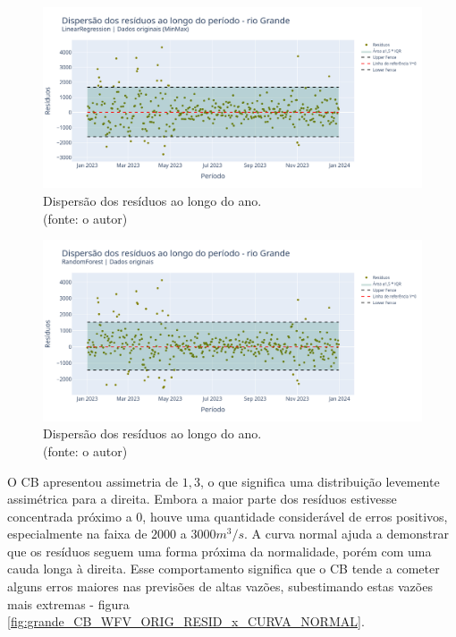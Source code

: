 \begin{figure}[!h]
\centering
\includegraphics[scale=0.33]{Figuras/rio_grande/wfv/LR/LR_WFV_ORIG_RESID_x_TEMPO.png}
\caption{Dispersão dos resíduos ao longo do ano.\\(fonte: o autor)}
\label{fig:grande_LR_WFV_ORIG_RESID_x_TEMPO}
\end{figure}

\begin{figure}[!h]
\centering
\includegraphics[scale=0.33]{Figuras/rio_grande/wfv/RF/RF_WFV_ORIG_RESID_x_TEMPO.png}
\caption{Dispersão dos resíduos ao longo do ano.\\(fonte: o autor)}
\label{fig:grande_RF_WFV_ORIG_RESID_x_TEMPO}
\end{figure}
\clearpage

O CB apresentou assimetria de $1,3$, o que significa uma distribuição levemente assimétrica para a direita. Embora a maior parte dos resíduos estivesse concentrada próximo a $0$, houve uma quantidade considerável de erros positivos, especialmente na faixa de $2000$ a $3000 m^3/s$. A curva normal ajuda a demonstrar que os resíduos seguem uma forma próxima da normalidade, porém com uma cauda longa à direita. Esse comportamento significa que o CB tende a cometer alguns erros maiores nas previsões de altas vazões, subestimando estas vazões mais extremas - figura \ref{fig:grande_CB_WFV_ORIG_RESID_x_CURVA_NORMAL}.

